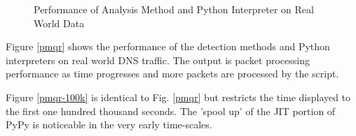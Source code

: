 \documentclass{llncs}
\begin{document}
\begin{figure}[h]
\centering
{}
\caption{Performance of Analysis Method and Python Interpreter on Real World Data}
\end{figure}

Figure \ref{pmqr} shows the performance of the detection methods and Python
interpreters on real world DNS traffic. The output is packet processing performance as time
progresses and more packets are processed by the script.



Figure \ref{pmqr-100k} is identical to Fig. \ref{pmqr} but restricts the time
displayed to the first one hundred thousand seconds. The 'spool up' of the JIT
portion of PyPy is noticeable in the very early time-scales.
\end{document}
